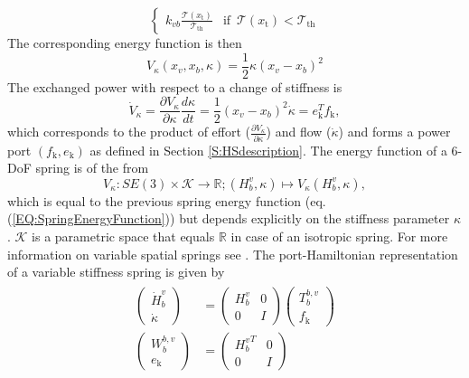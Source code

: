\documentclass[a4paper,twoside, openright,12pt]{report}
\newcommand{\g}[1]{\text{#1}}
\begin{document}
{\begin{equation}
\begin{cases}
k_{vb} \frac{\mathcal{T}(x_\g{t})}{\mathcal{T}_{\g{th}}} & \text{if } \, \mathcal{T}(x_\g{t}) < \mathcal{T}_{\g{th}}
\end{cases}
\end{equation}
The corresponding energy function is then
\begin{equation}
V_{\kappa}(x_v,x_b,\kappa) = \frac{1}{2} \kappa (x_v-x_b)^2
\end{equation}    
The exchanged power with respect to a change of stiffness is 
\begin{equation}
\dot{V}_{\kappa} =\frac{\partial V_{\kappa}}{\partial \kappa} \frac{d \kappa}{dt} = \frac{1}{2} (x_v-x_b)^2 \dot{\kappa} = e_\g{k}^Tf_\g{k},
\end{equation}
which corresponds to the product of effort ($\frac{\partial V_{\kappa}}{\partial \kappa}$) and flow ($\dot{\kappa}$) and forms a power port $(f_\g{k},e_\g{k})$ as defined in Section \ref{S:HSdescription}. The energy function of a $6$-DoF spring is of the from
\begin{equation}
V_{\kappa}:SE(3) \times \mathcal{K} \rightarrow \mathbb{R}; (H_b^v,\kappa)\mapsto V_{\kappa}(H_b^v,\kappa),
\end{equation}
which is equal to the previous spring energy function (eq. (\ref{EQ:SpringEnergyFunction})) but depends explicitly on the stiffness parameter $\kappa$. $\mathcal{K}$ is a parametric space that equals $\mathbb{R}$ in case of an isotropic spring. For more information on variable spatial springs see \cite{Stramigioli_01c}. The port-Hamiltonian representation of a variable stiffness spring is given by
\begin{eqnarray}
\begin{aligned}
\begin{pmatrix}
\dot{H}_b^v \\ \dot{\kappa}
\end{pmatrix}
&=
\begin{pmatrix}
H_b^v & 0 \\ 0 & I
\end{pmatrix}
\begin{pmatrix}
T_b^{b,v} \\ f_\g{k}
\end{pmatrix}
\\
\begin{pmatrix}
W_b^{b,v} \\ e_\g{k}
\end{pmatrix}
&=
\begin{pmatrix}
{H_b^v}^T & 0 \\ 0 & I

\end{pmatrix}
\end{aligned}
\end{eqnarray}}
\end{document}
